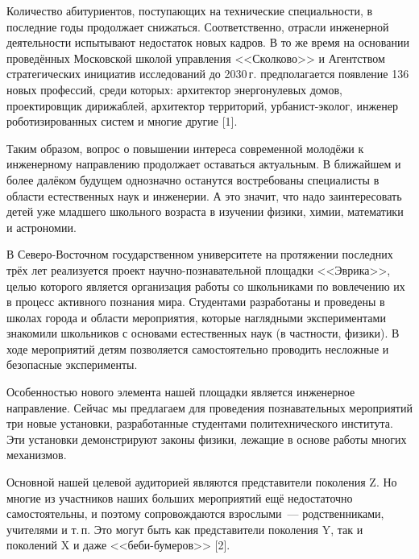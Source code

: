  

\makeProcTitle
{}

Количество абитуриентов, поступающих на технические специальности, в последние годы продолжает снижаться. Соответственно, отрасли инженерной деятельности испытывают недостаток новых кадров. В то же время на основании проведённых Московской школой управления <<Сколково>> и Агентством стратегических инициатив исследований до 2030\,г. предполагается появление 136 новых профессий, среди которых: архитектор энергонулевых домов, проектировщик дирижаблей, архитектор территорий, урбанист-эколог, инженер роботизированных систем и многие другие [1].

Таким образом, вопрос о повышении интереса современной молодёжи к инженерному направлению продолжает оставаться актуальным. В ближайшем и более далёком будущем однозначно останутся востребованы специалисты в области естественных наук и инженерии. А это значит, что надо заинтересовать детей уже младшего школьного возраста в изучении физики, химии, математики и астрономии.

В Северо-Восточном государственном университете на протяжении последних трёх лет реализуется проект научно-познавательной площадки <<Эврика>>, целью которого является организация работы со школьниками по вовлечению их в процесс активного познания мира. Студентами разработаны и проведены в школах города и области мероприятия, которые наглядными экспериментами знакомили школьников с основами естественных наук (в частности, физики). В ходе мероприятий детям позволяется самостоятельно проводить несложные и безопасные эксперименты.

Особенностью нового элемента нашей площадки является инженерное направление. Сейчас мы предлагаем для проведения познавательных мероприятий три новые установки, разработанные студентами политехнического института. Эти установки демонстрируют законы физики, лежащие в основе работы многих механизмов.

Основной нашей целевой аудиторией являются представители поколения Z. Но многие из участников наших больших мероприятий ещё недостаточно самостоятельны, и поэтому сопровождаются взрослыми~--- родственниками, учителями и т.\,п. Это могут быть как представители поколения Y, так и поколений X и даже <<беби-бумеров>> [2].


